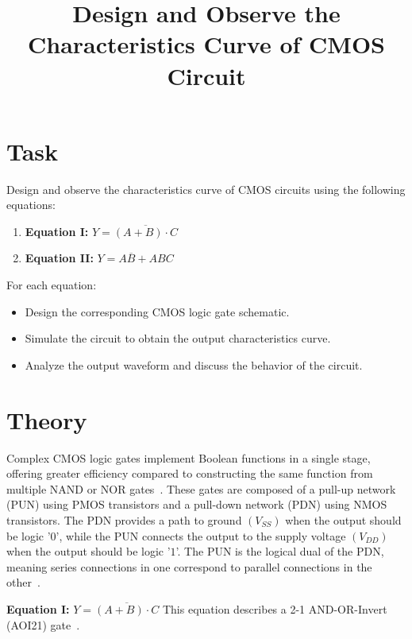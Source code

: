 \documentclass[12pt]{article}
\title{Design and Observe the Characteristics Curve of CMOS Circuit}
\author{}
\date{}
\begin{document}


\pagebreak

\tableofcontents

\pagebreak
{}
\maketitle

\section*{Task}
Design and observe the characteristics curve of CMOS circuits using the following equations:

\begin{enumerate}
  \item \textbf{Equation I:} \( Y = \overline{(A + B) \cdot C} \)
  \item \textbf{Equation II:} \( Y = A\overline{B} + ABC \)
\end{enumerate}

For each equation:
\begin{itemize}
  \item Design the corresponding CMOS logic gate schematic.
  \item Simulate the circuit to obtain the output characteristics curve.
  \item Analyze the output waveform and discuss the behavior of the circuit.
\end{itemize}

\section*{Theory}
Complex CMOS logic gates implement Boolean functions in a single stage, offering greater efficiency compared to constructing the same function from multiple NAND or NOR gates~\cite{WesteHarrisCMOS}. These gates are composed of a pull-up network (PUN) using PMOS transistors and a pull-down network (PDN) using NMOS transistors. The PDN provides a path to ground $(V_{SS})$ when the output should be logic '$0$', while the PUN connects the output to the supply voltage $(V_{DD})$ when the output should be logic '$1$'. The PUN is the logical dual of the PDN, meaning series connections in one correspond to parallel connections in the other~\cite{RabaeyDigitalIC}.

\textbf{Equation I:} \( Y = \overline{(A + B) \cdot C} \)
This equation describes a 2-1 AND-OR-Invert (AOI21) gate~\cite{WesteHarrisCMOS}.
\end{document}
